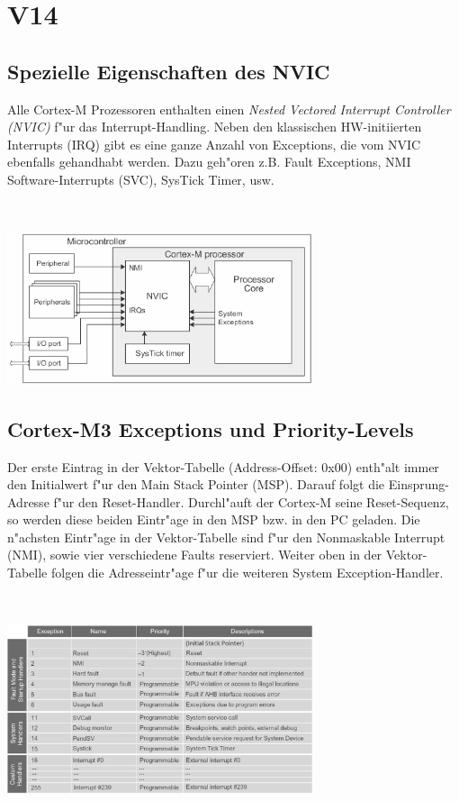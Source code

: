 \section{V14}
\subsection{Spezielle Eigenschaften des NVIC}\label{NVIC}
\begin{minipage}{9cm}
	Alle Cortex-M Prozessoren enthalten einen \textit{Nested Vectored Interrupt Controller (NVIC)} f"ur das Interrupt-Handling. Neben den klassischen HW-initiierten Interrupts (IRQ) gibt es eine ganze Anzahl von Exceptions, die vom NVIC ebenfalls gehandhabt werden. Dazu geh"oren z.B. Fault Exceptions, NMI Software-Interrupts (SVC), SysTick Timer, usw.
\end{minipage}
%
\begin{minipage}{0.5cm}
	\-\
\end{minipage}
%
\begin{minipage}{9cm}
	\includegraphics[width=9cm]{images/nvic-cortex-m3} 
\end{minipage}

\subsection{Cortex-M3 Exceptions und Priority-Levels}
\begin{minipage}{9cm}
	Der erste Eintrag in der Vektor-Tabelle (Address-Offset: 0x00) enth"alt immer den Initialwert f"ur den Main Stack Pointer (MSP). Darauf folgt die Einsprung-Adresse f"ur den Reset-Handler. Durchl"auft der Cortex-M seine Reset-Sequenz, so werden diese beiden Eintr"age in den MSP bzw. in den PC geladen. Die n"achsten Eintr"age in der Vektor-Tabelle sind f"ur den Nonmaskable Interrupt (NMI), sowie vier verschiedene Faults reserviert. Weiter oben in der Vektor-Tabelle folgen die
		Adresseintr"age f"ur die weiteren System Exception-Handler.
\end{minipage}
%
\begin{minipage}{0.5cm}
	\-\
\end{minipage}
%
\begin{minipage}{9cm}
	\includegraphics[width=9cm]{images/NVICExcp1} 
\end{minipage}


